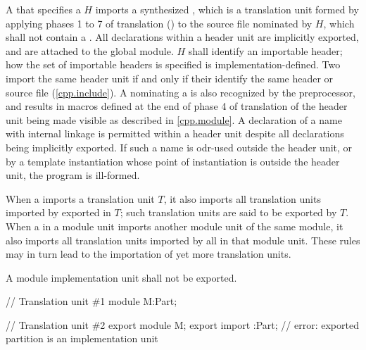 \begin{std.txt}
  \alinea
  A  that specifies
  a  $H$ imports
  a synthesized ,
  which is a translation unit formed by applying
  phases 1 to 7 of translation ()
  to the source file nominated by $H$,
  which shall not contain a .
  \enternote
  All declarations within a header unit are implicitly
  exported, and are attached to the global module.
  \exitnote
  $H$ shall identify an importable header;
  how the set of importable headers is specified
  is implementation-defined.
  Two
  import the same header unit if and only if
  their  identify the same
  header or source file (\ref{cpp.include}).
  \enternote
  A  nominating
  a  is also recognized by the
  preprocessor, and results in macros defined at the
  end of phase 4 of translation of the header unit
  being made visible as described in \ref{cpp.module}.
  \exitnote
  A declaration of a name with internal linkage is
  permitted within a header unit despite all
  declarations being implicitly exported.
  If such a name is odr-used outside the
  header unit, or by a template
  instantiation whose point of instantiation is outside
  the header unit, the program is ill-formed.

  \alinea
  When a  imports
  a translation unit $T$, it also imports
  all translation units imported by
  exported 
  in $T$; such translation units are
  said to be exported by $T$.
  When a  in a module unit imports
  another module unit of the same module, it also imports
  all translation units imported by
  all 
  in that module unit.
  These rules may in turn lead to the importation of yet more
  translation units.

  \alinea
  \color{addclr}
  A module implementation unit shall not be exported.
  \begin{example}
  \begin{Program}
// Translation unit \#1
module M:Part;

// Translation unit \#2
export module M;
export import :Part;    // error: exported partition  is an implementation unit
  \end{Program}
  \end{example}


\end{std.txt}
